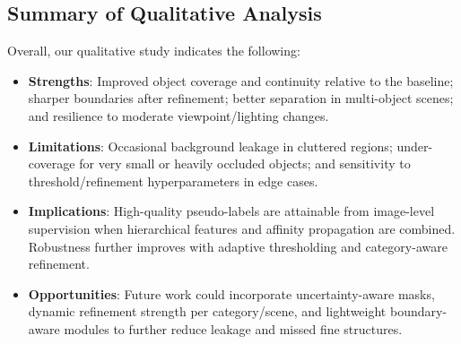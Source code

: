 \subsection{Summary of Qualitative Analysis}
\label{subsubsec:qualitative_summary}
Overall, our qualitative study indicates the following:
\begin{itemize}
  \item \textbf{Strengths}: Improved object coverage and continuity relative to the baseline; sharper boundaries after refinement; better separation in multi-object scenes; and resilience to moderate viewpoint/lighting changes.
  \item \textbf{Limitations}: Occasional background leakage in cluttered regions; under-coverage for very small or heavily occluded objects; and sensitivity to threshold/refinement hyperparameters in edge cases.
  \item \textbf{Implications}: High-quality pseudo-labels are attainable from image-level supervision when hierarchical features and affinity propagation are combined. Robustness further improves with adaptive thresholding and category-aware refinement.
  \item \textbf{Opportunities}: Future work could incorporate uncertainty-aware masks, dynamic refinement strength per category/scene, and lightweight boundary-aware modules to further reduce leakage and missed fine structures.
\end{itemize}





